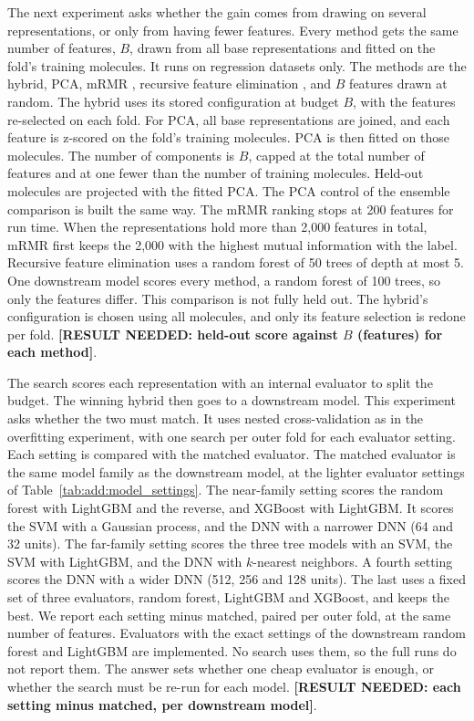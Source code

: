 The next experiment asks whether the gain comes from drawing on several representations, or only from having fewer features. Every method gets the same number of features, $B$, drawn from all base representations and fitted on the fold's training molecules. It runs on regression datasets only. The methods are the hybrid, PCA, mRMR \citep{Peng2005}, recursive feature elimination \citep{Guyon2002}, and $B$ features drawn at random. The hybrid uses its stored configuration at budget $B$, with the features re-selected on each fold. For PCA, all base representations are joined, and each feature is z-scored on the fold's training molecules. PCA is then fitted on those molecules. The number of components is $B$, capped at the total number of features and at one fewer than the number of training molecules. Held-out molecules are projected with the fitted PCA. The PCA control of the ensemble comparison is built the same way. The mRMR ranking stops at 200 features for run time. When the representations hold more than 2,000 features in total, mRMR first keeps the 2,000 with the highest mutual information with the label. Recursive feature elimination uses a random forest of 50 trees of depth at most 5. One downstream model scores every method, a random forest of 100 trees, so only the features differ. This comparison is not fully held out. The hybrid's configuration is chosen using all molecules, and only its feature selection is redone per fold. \textbf{[RESULT NEEDED: held-out score against $B$ (features) for each method]}.

The search scores each representation with an internal evaluator to split the budget. The winning hybrid then goes to a downstream model. This experiment asks whether the two must match. It uses nested cross-validation as in the overfitting experiment, with one search per outer fold for each evaluator setting. Each setting is compared with the matched evaluator. The matched evaluator is the same model family as the downstream model, at the lighter evaluator settings of Table~\ref{tab:add:model_settings}. The near-family setting scores the random forest with LightGBM and the reverse, and XGBoost with LightGBM. It scores the SVM with a Gaussian process, and the DNN with a narrower DNN (64 and 32 units). The far-family setting scores the three tree models with an SVM, the SVM with LightGBM, and the DNN with $k$-nearest neighbors. A fourth setting scores the DNN with a wider DNN (512, 256 and 128 units). The last uses a fixed set of three evaluators, random forest, LightGBM and XGBoost, and keeps the best. We report each setting minus matched, paired per outer fold, at the same number of features. Evaluators with the exact settings of the downstream random forest and LightGBM are implemented. No search uses them, so the full runs do not report them. The answer sets whether one cheap evaluator is enough, or whether the search must be re-run for each model. \textbf{[RESULT NEEDED: each setting minus matched, per downstream model]}.

